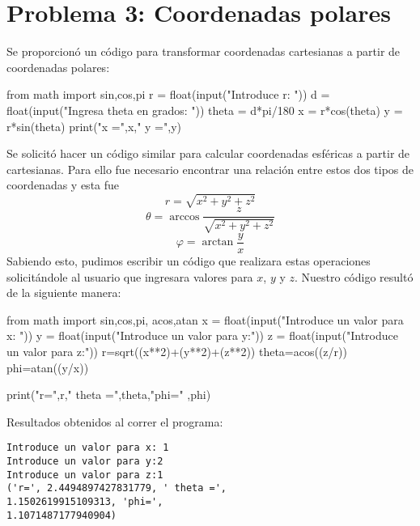 \documentclass[12 pt,twocolumn]{article}
\begin{document}
\section{\small Problema 3: Coordenadas polares}
Se proporcionó un código para transformar coordenadas cartesianas a partir de coordenadas polares:
\begin{center}
\begin{boxedverbatim}
from math import sin,cos,pi
r = float(input("Introduce r: "))
d = float(input("Ingresa theta en 
grados: "))
theta = d*pi/180
x = r*cos(theta)
y = r*sin(theta)
print("x =",x," y =",y)
\end{boxedverbatim}
\end{center}
Se solicitó hacer un código similar para calcular coordenadas esféricas a partir de cartesianas. Para ello fue necesario encontrar una relación entre estos dos tipos de coordenadas y esta fue $$r=\sqrt{x^2+y^2+z^2}$$ $$\theta=\arccos{\frac{z}{\sqrt{x^2+y^2+z^2}}}$$ $$\varphi=\arctan{\frac{y}{x}} $$
Sabiendo esto, pudimos escribir un código que realizara estas operaciones solicitándole al usuario que ingresara valores para $x$, $y$ y $z$.
Nuestro código resultó de la siguiente manera:
\begin{center}
\begin{boxedverbatim}
from math import sin,cos,pi,
acos,atan
x = float(input("Introduce 
un valor 
para x: "))
y = float(input("Introduce
un valor 
para y:"))
z = float(input("Introduce 
un valor 
para z:"))
r=sqrt((x**2)+(y**2)+(z**2))
theta=acos((z/r))
phi=atan((y/x))

print("r=",r," theta =",theta,"phi="
,phi)
\end{boxedverbatim}
\end{center}
Resultados obtenidos al correr el programa:
\begin{verbatim}
Introduce un valor para x: 1
Introduce un valor para y:2
Introduce un valor para z:1
('r=', 2.4494897427831779, ' theta =', 
1.1502619915109313, 'phi=',
1.1071487177940904)
\end{verbatim}
\end{document}
